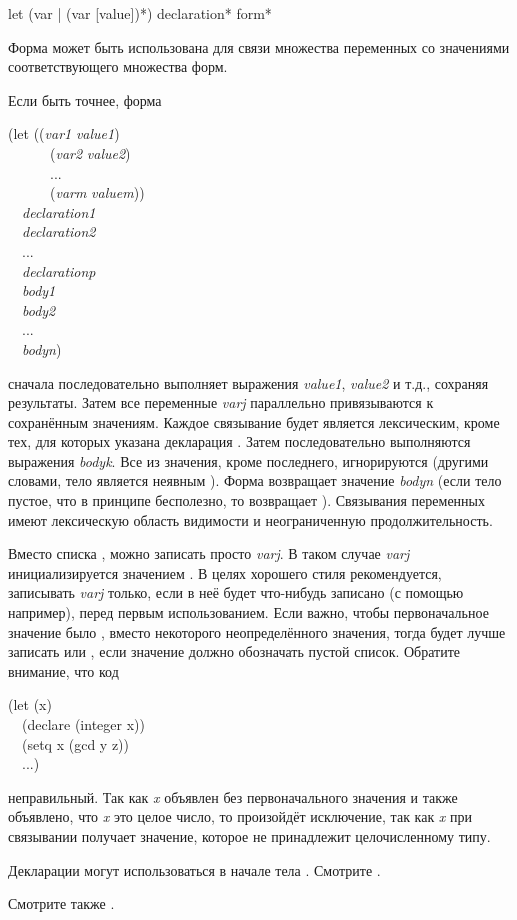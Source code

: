 \begin{defspec}
let ({var | (var [value])}*) {declaration}* {form}*

Форма  может быть использована для связи множества переменных со
значениями соответствующего множества форм.

Если быть точнее, форма
\begin{lisp}
(let ((\emph{var1} \emph{value1}) \\
~~~~~~(\emph{var2} \emph{value2}) \\
~~~~~~... \\
~~~~~~(\emph{varm} \emph{valuem})) \\
~~\emph{declaration1} \\
~~\emph{declaration2} \\
~~... \\
~~\emph{declarationp} \\
~~\emph{body1} \\
~~\emph{body2} \\
~~... \\
~~\emph{bodyn})
\end{lisp}
сначала последовательно выполняет выражения \emph{value1}, \emph{value2} и т.д.,
сохраняя результаты.
Затем все переменные \emph{varj} параллельно привязываются к сохранённым
значениям. Каждое связывание будет является лексическим, кроме тех, для которых
указана декларация .
Затем последовательно выполняются выражения \emph{bodyk}. Все из значения, кроме
последнего, игнорируются (другими словами, тело  является неявным
).
Форма  возвращает значение \emph{bodyn} (если тело пустое, что в
принципе бесполезно, то  возвращает {\false}).
Связывания переменных имеют лексическую область видимости и неограниченную
продолжительность.

Вместо списка , можно записать просто
\emph{varj}. В таком случае \emph{varj} инициализируется значением {\false}.
В целях хорошего стиля рекомендуется, записывать \emph{varj} только, если в неё
будет что-нибудь записано (с помощью  например), перед первым
использованием. 
Если важно, чтобы первоначальное значение было {\false}, вместо некоторого
неопределённого значения,
тогда будет лучше записать  или , если значение должно обозначать пустой список. Обратите
внимание, что код
\begin{lisp}
(let (x) \\
~~(declare (integer x)) \\
~~(setq x (gcd y z)) \\
~~...)
\end{lisp}
неправильный. Так как \emph{x} объявлен без первоначального значения и также
объявлено, что \emph{x} это целое число, то произойдёт исключение, так как
\emph{x} при связывании получает {\nil} значение, которое не принадлежит
целочисленному типу.

Декларации могут использоваться в начале тела . Смотрите .

Смотрите также .
\end{defspec}

